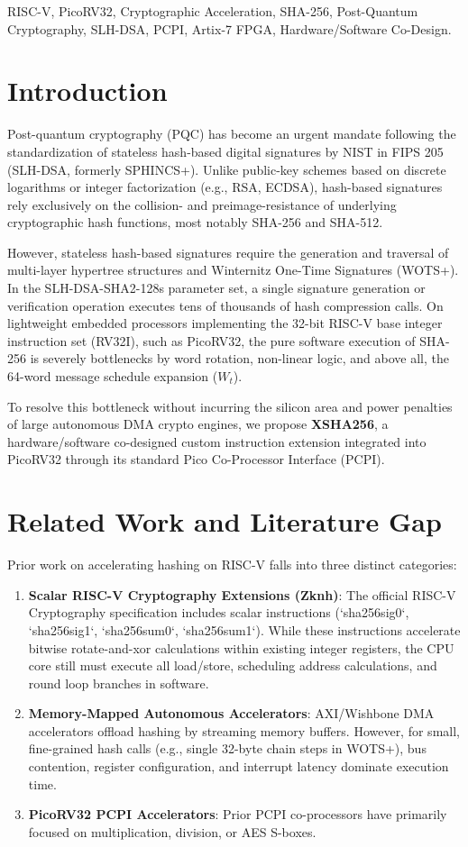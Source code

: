 \documentclass[conference]{IEEEtran}
\begin{document}
\begin{IEEEkeywords}
RISC-V, PicoRV32, Cryptographic Acceleration, SHA-256, Post-Quantum Cryptography, SLH-DSA, PCPI, Artix-7 FPGA, Hardware/Software Co-Design.
\end{IEEEkeywords}

\section{Introduction}
Post-quantum cryptography (PQC) has become an urgent mandate following the standardization of stateless hash-based digital signatures by NIST in FIPS 205 (SLH-DSA, formerly SPHINCS+). Unlike public-key schemes based on discrete logarithms or integer factorization (e.g., RSA, ECDSA), hash-based signatures rely exclusively on the collision- and preimage-resistance of underlying cryptographic hash functions, most notably SHA-256 and SHA-512.

However, stateless hash-based signatures require the generation and traversal of multi-layer hypertree structures and Winternitz One-Time Signatures (WOTS+). In the SLH-DSA-SHA2-128s parameter set, a single signature generation or verification operation executes tens of thousands of hash compression calls. On lightweight embedded processors implementing the 32-bit RISC-V base integer instruction set (RV32I), such as PicoRV32, the pure software execution of SHA-256 is severely bottlenecks by word rotation, non-linear logic, and above all, the 64-word message schedule expansion ($W_t$).

To resolve this bottleneck without incurring the silicon area and power penalties of large autonomous DMA crypto engines, we propose \textbf{XSHA256}, a hardware/software co-designed custom instruction extension integrated into PicoRV32 through its standard Pico Co-Processor Interface (PCPI).

\section{Related Work and Literature Gap}
Prior work on accelerating hashing on RISC-V falls into three distinct categories:
\begin{enumerate}
    \item \textbf{Scalar RISC-V Cryptography Extensions (Zknh)}: The official RISC-V Cryptography specification includes scalar instructions (`sha256sig0`, `sha256sig1`, `sha256sum0`, `sha256sum1`). While these instructions accelerate bitwise rotate-and-xor calculations within existing integer registers, the CPU core still must execute all load/store, scheduling address calculations, and round loop branches in software.
    \item \textbf{Memory-Mapped Autonomous Accelerators}: AXI/Wishbone DMA accelerators offload hashing by streaming memory buffers. However, for small, fine-grained hash calls (e.g., single 32-byte chain steps in WOTS+), bus contention, register configuration, and interrupt latency dominate execution time.
    \item \textbf{PicoRV32 PCPI Accelerators}: Prior PCPI co-processors have primarily focused on multiplication, division, or AES S-boxes.
\end{enumerate}
\end{document}
